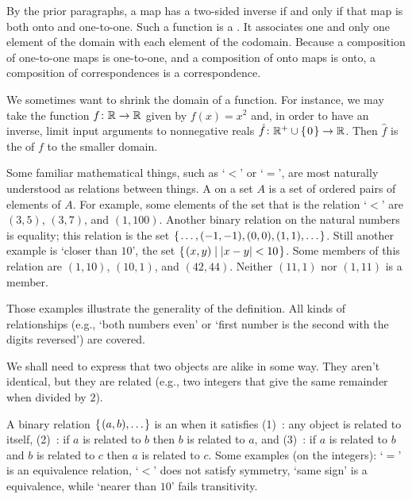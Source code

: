 By the prior paragraphs, a map has a two-sided inverse 
if and only if that map is both onto and one-to-one. 
Such a function is a 
.
It associates one and only one element of the domain with each element of the
codomain.
Because a composition of one-to-one maps is one-to-one, and a composition
of onto maps is onto, a composition of correspondences is a
correspondence.

We sometimes want to shrink the domain of a function.
For instance, we may take the function \( \mbox{$f\colon \mathbb{R}\to \mathbb{R}$} \) given by
\( f(x)=x^2 \) and, in order to have an inverse, limit input arguments to
nonnegative reals \( \mbox{$\hat{f}\colon \mathbb{R}^+\cup\mbox{$\{\hspace{0.1em}0\hspace{0.1em}\}$}\to \mathbb{R}$} \).
Then \( \hat{f} \) is 
the  of
\( f \) to the smaller domain.








Some familiar mathematical things, such as `\( < \)' or `\( = \)',
are most naturally understood as relations between things.
A  on a set \( A \) is
a set of ordered pairs of elements of \( A \).
For example, some elements of the set that is the
relation `$<$' are
\( (3,5) \), \( (3,7) \), and \( (1,100) \).
Another binary relation on the natural numbers is equality; this relation is
the set
\( \mbox{$\{\hspace{0.1em}\ldots,(-1,-1),(0,0),(1,1),\ldots\hspace{0.1em}\}$} \).
Still another example is `closer than \( 10 \)', the set
\( \mbox{$\{\hspace{0.1em}(x,y)\mid |x-y|<10 \hspace{0.1em}\}$} \).
Some members of this relation are \( (1,10) \), \( (10,1) \),
and \( (42,44) \).
Neither \( (11,1) \) nor \( (1,11) \) is a member.

Those examples illustrate the generality of the definition.
All kinds of relationships (e.g., `both numbers
even' or `first number is the second with the digits reversed')
are covered.




We shall need to express that two objects are alike in some way.
They aren't identical, but they are related
(e.g., two integers that give the same remainder when divided by \( 2 \)).

A binary relation \( \mbox{$\{\hspace{0.1em}(a,b),\ldots \hspace{0.1em}\}$} \)
is an 
when it satisfies
(1)~: 
     any object is related to itself,
(2)~: 
     if \( a \) is related to \( b \) then
     \( b \) is related to \( a \), and
(3)~:
     if \( a \) is related to \( b \) and \( b \) is
     related to \( c \) then \( a \) is related to \( c \).
Some examples (on the integers): `\( = \)' is an equivalence relation,
`\( < \)' does not satisfy symmetry,
`same sign' is a equivalence, while `nearer than \( 10 \)' fails transitivity.






